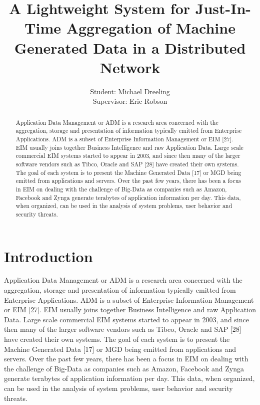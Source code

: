 \documentclass{llncs}
\begin{document}
%
\newpage
\tableofcontents
\newpage

%
\title{A Lightweight System for Just-In-Time Aggregation of Machine Generated Data in a Distributed Network}

\author {Student: Michael Dreeling\\{ Supervisor: Eric Robson}}

\maketitle
%
\begin{abstract}
Application Data Management or ADM is a research area concerned with the aggregation, storage and presentation of information typically emitted from Enterprise Applications. ADM is a subset of Enterprise Information Management or EIM [27]. EIM usually joins together Business Intelligence and raw Application Data. Large scale commercial EIM systems started to appear in 2003, and since then many of the larger software vendors such as Tibco, Oracle and SAP [28] have created their own systems. The goal of each system is to present the Machine Generated Data [17] or MGD being emitted from applications and servers. Over the past few years, there has been a focus in EIM on dealing with the challenge of Big-Data as companies such as Amazon, Facebook and Zynga generate terabytes of application information per day. This data, when organized, can be used in the analysis of system problems, user behavior and security threats.
\end{abstract}
%
\section{Introduction}
%
Application Data Management or ADM is a research area concerned with the aggregation, storage and presentation of information typically emitted from Enterprise Applications. ADM is a subset of Enterprise Information Management or EIM [27]. EIM usually joins together Business Intelligence and raw Application Data. Large scale commercial EIM systems started to appear in 2003, and since then many of the larger software vendors such as Tibco, Oracle and SAP [28] have created their own systems. The goal of each system is to present the Machine Generated Data [17] or MGD being emitted from applications and servers. Over the past few years, there has been a focus in EIM on dealing with the challenge of Big-Data as companies such as Amazon, Facebook and Zynga generate terabytes of application information per day. This data, when organized, can be used in the analysis of system problems, user behavior and security threats.
\end{document}
